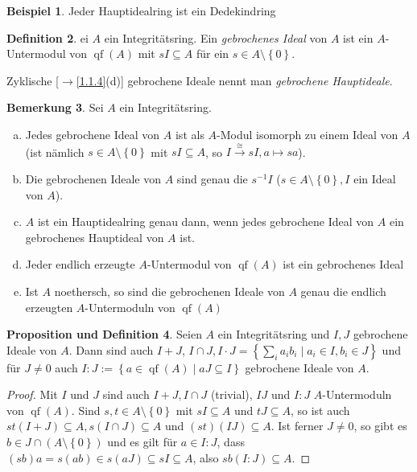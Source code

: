 \documentclass[
twoside=semi,
fontsize=12,
DIV=12, 
cleardoublepage=current,
leqno,
headings=optiontoheadandtoc, 
toc=idx
]{scrbook}
\newcommand{\set}[1]{\left\{ #1 \right\}}
\DeclareMathOperator{\qf}{qf}
\theoremstyle{definition}
\newtheorem{definition}{Definition}[section]
\newtheorem{bemerkung}[definition]{Bemerkung}
\newtheorem{beispiel}[definition]{Beispiel}
\newtheorem{prop-def}[definition]{Proposition und Definition}
\begin{document}
 	\begin{beispiel}\label{2.2.5}\hfill\newline
 		Jeder Hauptidealring ist ein Dedekindring
 	\end{beispiel}
 
 	\begin{definition}\label{2.2.6}\hfill\newline
 		ei $A$ ein Integrit\"atsring. Ein \emph{gebrochenes Ideal} von $A$ ist ein $A$-Untermodul von $\qf(A)$ mit $sI \subseteq A$ f\"ur ein $s \in A\setminus\set{0}$.
 		
 		Zyklische [$\to$\ref{1.1.4}(d)] gebrochene Ideale nennt man \emph{gebrochene Hauptideale}.
 	\end{definition}
 
 	\begin{bemerkung}\label{2.2.7}\hfill\newline
 		Sei $A$ ein Integrit\"atsring.
 		\begin{enumerate}[(a)]
 			\item Jedes gebrochene Ideal von $A$ ist als $A$-Modul isomorph zu einem Ideal von $A$ (ist n\"amlich $s \in A \setminus \set{0}$ mit $sI \subseteq A$, so $I \xrightarrow{\cong} sI, a\mapsto sa$).
 			\item  Die gebrochenen Ideale von $A$ sind genau die $s^{-1}I$ ($s \in A \setminus \set{0}, I$ ein Ideal von $A$).
 			\item $A$ ist ein Hauptidealring genau dann, wenn jedes gebrochene Ideal von $A$ ein gebrochenes Hauptideal von $A$ ist.
 			\item Jeder endlich erzeugte $A$-Untermodul von $\qf(A)$ ist ein gebrochenes Ideal
 			\item Ist $A$ noethersch, so sind die gebrochenen Ideale von $A$ genau die endlich erzeugten $A$-Untermoduln von $\qf(A)$
 		\end{enumerate}
 	\end{bemerkung}
 
 	\begin{prop-def}\label{2.2.8}\hfill\newline
 		Seien $A$ ein Integrit\"atsring und $I, J$ gebrochene Ideale von $A$. Dann sind auch $I+J$, \linebreak $\displaystyle I \cap J, I \cdot J = \set{\sum_{i}a_ib_i \mid a_i \in I, b_i \in J}$ und f\"ur $J \neq 0$ auch 
 		$I:J := \set{a \in \qf(A)\mid aJ \subseteq I}$ gebrochene Ideale von $A$.
 		
 		\begin{proof}
 			Mit $I$ und $J$ sind auch $I + J, I \cap J$ (trivial), $IJ$ und $I:J$ $A$-Untermoduln von $\qf(A)$. Sind $s,t \in A \setminus \set{0}$ mit $sI \subseteq A$ und $tJ \subseteq A$, so ist auch $st(I+J) \subseteq A, s(I \cap J)\subseteq A$ und $(st)(IJ) \subseteq A$. Ist ferner $J \neq 0$, so gibt es $b \in J \cap (A \setminus \set{0})$ und es gilt f\"ur $a \in I:J$, dass $(sb)a = s(ab) \in s(aJ)\subseteq sI \subseteq A$, also $sb(I:J) \subseteq A$.
 		\end{proof}
 	\end{prop-def}
 
\end{document}
